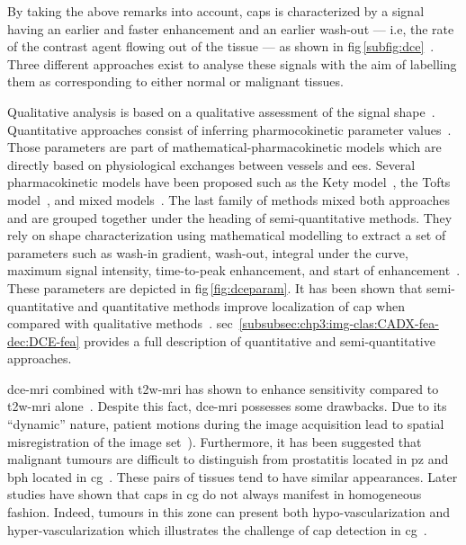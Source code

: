 By taking the above remarks into account, \acp{cap} is characterized by a signal having an earlier and faster enhancement and an earlier wash-out --- i.e, the rate of the contrast agent flowing out of the tissue --- as shown in \acs{fig}\,\ref{subfig:dce}~\cite{Verma2012}.
Three different approaches exist to analyse these signals with the aim of labelling them as corresponding to either normal or malignant tissues.

Qualitative analysis is based on a qualitative assessment of the signal shape~\cite{Hoeks2011}.
Quantitative approaches consist of inferring pharmocokinetic parameter values~\cite{Tofts2010}.
Those parameters are part of mathematical-pharmacokinetic models which are directly based on physiological exchanges between vessels and \ac{ees}.
Several pharmacokinetic models have been proposed such as the Kety model~\cite{Kety1951}, the Tofts model~\cite{Tofts1997}, and mixed models~\cite{Larsson1996,StLawrence1998}.
The last family of methods mixed both approaches and are grouped together under the heading of semi-quantitative methods.
They rely on shape characterization using mathematical modelling to extract a set of parameters such as wash-in gradient, wash-out, integral under the curve, maximum signal intensity, time-to-peak enhancement, and start of enhancement~\cite{Hoeks2011,Verma2012}.
These parameters are depicted in \acs{fig}\,\ref{fig:dceparam}.
It has been shown that semi-quantitative and quantitative methods improve localization of \ac{cap} when compared with qualitative methods~\cite{Rosenkrantz2013}.
\Ac{sec}~\ref{subsubsec:chp3:img-clas:CADX-fea-dec:DCE-fea} provides a full description of quantitative and semi-quantitative approaches.

\ac{dce}-\ac{mri} combined with \ac{t2w}-\ac{mri} has shown to enhance sensitivity compared to \ac{t2w}-\ac{mri} alone~\cite{Jager1997,Kim2005,Schlemmer2004,Zelhof2009}.
Despite this fact, \ac{dce}-\ac{mri} possesses some drawbacks.
Due to its ``dynamic'' nature, patient motions during the image acquisition lead to spatial misregistration of the image set~\cite{Verma2012}).
Furthermore, it has been suggested that malignant tumours are difficult to distinguish from prostatitis located in \ac{pz} and \ac{bph} located in \ac{cg}~\cite{Hoeks2011,Verma2012}.
These pairs of tissues tend to have similar appearances.
Later studies have shown that \acp{cap} in \ac{cg} do not always manifest in homogeneous fashion.
Indeed, tumours in this zone can present both hypo-vascularization and hyper-vascularization which illustrates the challenge of \ac{cap} detection in \ac{cg}~\cite{Niekerk2013}.

